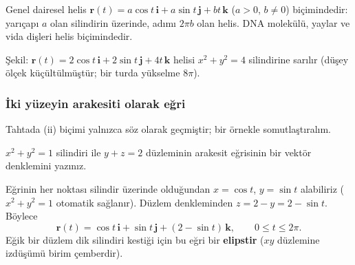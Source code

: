 Genel dairesel helis $\mathbf r(t)=a\cos t\,\mathbf i+a\sin t\,\mathbf j+bt\,\mathbf k$ ($a>0$, $b\ne0$) biçimindedir:
yarıçapı $a$ olan silindirin üzerinde, adımı $2\pi b$ olan helis. DNA molekülü, yaylar ve vida dişleri helis biçimindedir.

\begin{center}

{\small Şekil: $\mathbf r(t)=2\cos t\,\mathbf i+2\sin t\,\mathbf j+4t\,\mathbf k$ helisi $x^2+y^2=4$ silindirine sarılır
(düşey ölçek küçültülmüştür; bir turda yükselme $8\pi$).}
\end{center}

\subsubsection{İki yüzeyin arakesiti olarak eğri}

Tahtada (ii) biçimi yalnızca söz olarak geçmiştir; bir örnekle somutlaştıralım.

\begin{soru}
$x^2+y^2=1$ silindiri ile $y+z=2$ düzleminin arakesit eğrisinin bir vektör denklemini yazınız.
\end{soru}
\begin{cevap}
Eğrinin her noktası silindir üzerinde olduğundan $x=\cos t$, $y=\sin t$ alabiliriz ($x^2+y^2=1$ otomatik sağlanır).
Düzlem denkleminden $z=2-y=2-\sin t$. Böylece
\[ \mathbf r(t)=\cos t\,\mathbf i+\sin t\,\mathbf j+(2-\sin t)\,\mathbf k,\qquad 0\le t\le 2\pi . \]
Eğik bir düzlem dik silindiri kestiği için bu eğri bir \textbf{elipstir} ($xy$ düzlemine izdüşümü birim çemberdir).
\end{cevap}

